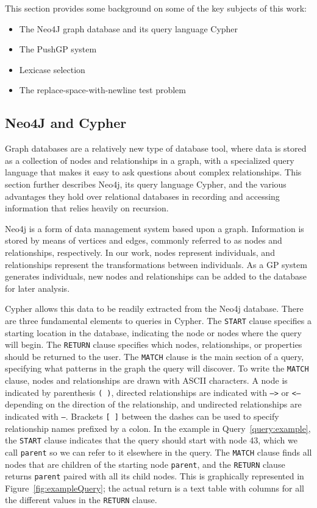 This section provides some background on some of the key subjects of this work:
\begin{itemize}
	\item The Neo4J graph database and its query language Cypher
	\item The PushGP system
	\item Lexicase selection
	\item The replace-space-with-newline test problem
\end{itemize} 

\subsection{Neo4J and Cypher}
\label{subsec:Neo4j}

Graph databases \citep{Robinson:GraphDB:Book} are a relatively new type of database tool, where data is stored 
as a collection of nodes and relationships in a graph, with a specialized query language that makes 
it easy to ask questions about complex relationships. This section further describes Neo4j, its query 
language Cypher, and the various advantages they hold over relational databases in recording and 
accessing information that relies heavily on recursion.

Neo4j is a form of data management system based upon a graph. Information is stored by means of 
vertices and edges, commonly referred to as nodes and relationships, 
respectively. In our work, nodes represent individuals, and relationships represent the 
transformations between individuals. As a GP system generates individuals, new nodes and 
relationships can be added to the database for later analysis.

Cypher allows this data to be readily extracted from the Neo4j database. There are three 
fundamental elements to queries in Cypher. The \texttt{START} clause specifies a starting location 
in the database, indicating the node or nodes where the query will begin. The \texttt{RETURN} 
clause specifies which nodes, relationships, or properties should be returned to the user. 
The \texttt{MATCH} clause is the main section of a query, specifying what patterns in the 
graph the query will discover. To write the \texttt{MATCH} clause, nodes and relationships 
are drawn with ASCII characters. A node is indicated by parenthesis \texttt{( )}, directed 
relationships are indicated with \texttt{-->} or \texttt{<--} depending on the direction of 
the relationship, and undirected relationships are indicated with \texttt{--}. 
Brackets \texttt{[ ]} between the dashes can be used to specify relationship names prefixed 
by a colon. In the example in Query~\ref{query:example}, the \texttt{START} clause indicates 
that the query should start with node 43, which we call \texttt{parent} so we can refer to it
elsewhere in the query. The \texttt{MATCH} clause finds all nodes that are children of the 
starting node \texttt{parent}, and the \texttt{RETURN} clause returns \texttt{parent} paired with
all its child nodes. This is graphically represented in Figure~\ref{fig:exampleQuery}; the actual
return is a text table with columns for all the different values in the \texttt{RETURN} clause.

